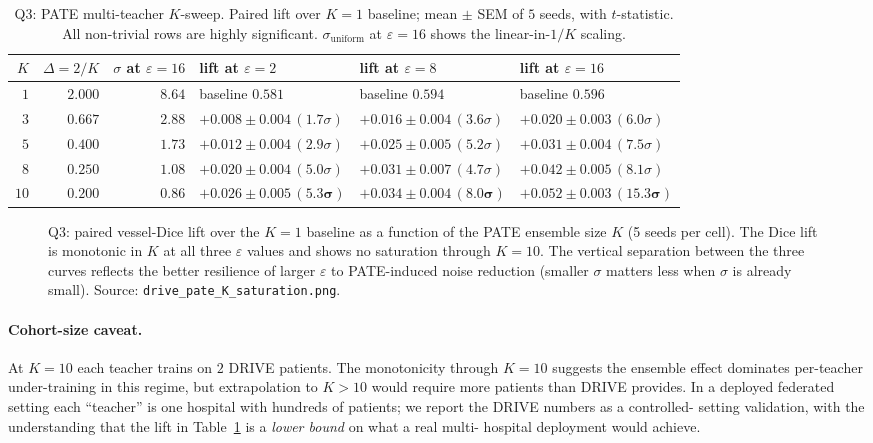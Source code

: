 \begin{table}[t]
\centering
\small
\caption{Q3: PATE multi-teacher $K$-sweep. Paired lift over $K\!=\!1$
baseline; mean $\pm$ SEM of $5$ seeds, with $t$-statistic. All non-trivial
rows are highly significant. $\sigma_{\mathrm{uniform}}$ at
$\varepsilon\!=\!16$ shows the linear-in-$1/K$ scaling.}
\label{tab:k-sat}
\begin{tabular}{r r r l l l}
\toprule
   $K$ & $\Delta\!=\!2/K$
       & $\sigma$ at $\varepsilon\!=\!16$
       & lift at $\varepsilon\!=\!2$
       & lift at $\varepsilon\!=\!8$
       & lift at $\varepsilon\!=\!16$ \\
\midrule
$1$   & $2.000$ & $8.64$  & baseline $0.581$  & baseline $0.594$  & baseline $0.596$ \\
$3$   & $0.667$ & $2.88$  & $+0.008\!\pm\!0.004\,(1.7\sigma)$  & $+0.016\!\pm\!0.004\,(3.6\sigma)$  & $+0.020\!\pm\!0.003\,(6.0\sigma)$ \\
$5$   & $0.400$ & $1.73$  & $+0.012\!\pm\!0.004\,(2.9\sigma)$  & $+0.025\!\pm\!0.005\,(5.2\sigma)$  & $+0.031\!\pm\!0.004\,(7.5\sigma)$ \\
$8$   & $0.250$ & $1.08$  & $+0.020\!\pm\!0.004\,(5.0\sigma)$  & $+0.031\!\pm\!0.007\,(4.7\sigma)$  & $+0.042\!\pm\!0.005\,(8.1\sigma)$ \\
$10$  & $0.200$ & $0.86$  & $\mathbf{+0.026\!\pm\!0.005\,(5.3\sigma)}$
                        & $\mathbf{+0.034\!\pm\!0.004\,(8.0\sigma)}$
                        & $\mathbf{+0.052\!\pm\!0.003\,(15.3\sigma)}$ \\
\bottomrule
\end{tabular}
\end{table}

\begin{figure}[t]
\caption{Q3: paired vessel-Dice lift over the $K\!=\!1$ baseline as a
function of the PATE ensemble size $K$ (5 seeds per cell). The Dice
lift is monotonic in $K$ at all three $\varepsilon$ values and shows
no saturation through $K\!=\!10$. The vertical separation between the
three curves reflects the better resilience of larger $\varepsilon$ to
PATE-induced noise reduction (smaller $\sigma$ matters less when
$\sigma$ is already small). Source:
\texttt{drive\_pate\_K\_saturation.png}.}
\label{fig:k-saturation}
\end{figure}

\paragraph{Cohort-size caveat.}
At $K\!=\!10$ each teacher trains on $2$ DRIVE patients. The
monotonicity through $K\!=\!10$ suggests the ensemble effect dominates
per-teacher under-training in this regime, but extrapolation to
$K\!>\!10$ would require more patients than DRIVE provides. In a
deployed federated setting each ``teacher'' is one hospital with
hundreds of patients; we report the DRIVE numbers as a controlled-
setting validation, with the understanding that the lift in
Table~\ref{tab:k-sat} is a \emph{lower bound} on what a real multi-
hospital deployment would achieve.

